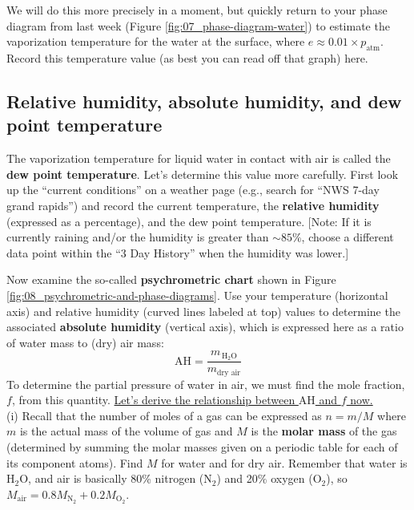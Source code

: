 \answerspace

\noindent We will do this more precisely in a moment, but quickly return to your phase diagram from last week  (Figure \ref{fig:07_phase-diagram-water}) to estimate the vaporization temperature for the water at the surface, where $e \approx 0.01 \times p_\text{atm}$.  Record this temperature value (as best you can read off that graph) here.

\answerspace[2cm]

\subsection{Relative humidity, absolute humidity, and dew point temperature}

\noindent The vaporization temperature for liquid water in contact with air is called the {\bf dew point temperature}.  Let's determine this value more carefully.  First look up the ``current conditions'' on a weather page (e.g., search for ``NWS 7-day grand rapids'') and record the current temperature, the {\bf relative humidity} (expressed as a percentage), and the dew point temperature. [Note: If it is currently raining and/or the humidity is greater than $\sim85\%$, choose a different data point within the ``3 Day History'' when the humidity was lower.]

\answerspace[2cm]

\noindent Now examine the so-called {\bf psychrometric chart} shown in Figure \ref{fig:08_psychrometric-and-phase-diagrams}.  Use your temperature (horizontal axis) and relative humidity (curved lines labeled at top) values to determine the associated {\bf absolute humidity} (vertical axis), which is expressed here as a ratio of water mass to (dry) air mass:
	\begin{equation*}
	\text{AH} = \frac{m_{\, \text{H}_2\text{O}}}{m_\text{dry air}}
	\end{equation*}
To determine the partial pressure of water in air, we must find the mole fraction, $f$, from this quantity.  \underline{Let's derive the relationship between $\text{AH}$ and $f$ now.}  \\[-6pt]

\noindent (i) Recall that the number of moles of a gas can be expressed as $n = m / M$ where $m$ is the actual mass of the volume of gas and $M$ is the {\bf molar mass} of the gas (determined by summing the molar masses given on a periodic table for each of its component atoms).  Find $M$ for water and for dry air. Remember that water is $\text{H}_2 \text{O}$, and air is basically 80\% nitrogen ($\text{N}_2$) and 20\% oxygen ($\text{O}_2$), so $M_\text{air} = 0.8 M_{\text{N}_2} + 0.2 M_{\text{O}_2}$. 

